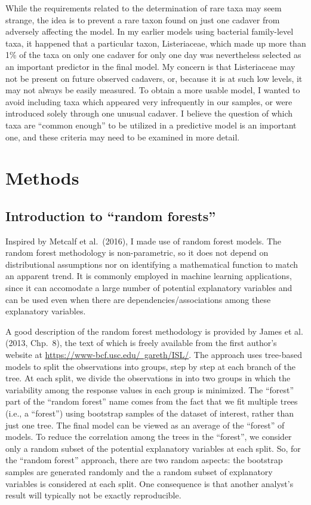 \documentclass{article}
\begin{document}
While the requirements related to the determination of rare taxa may
seem strange, the idea is to prevent a rare taxon found on just one
cadaver from adversely affecting the model.  In my earlier models
using bacterial family-level taxa, it happened that a particular
taxon, Listeriaceae, which made up more than 1\% of the taxa on only
one cadaver for only one day was nevertheless selected as an important
predictor in the final model.  My concern is that Listeriaceae may not
be present on future observed cadavers, or, because it is at such low
levels, it may not always be easily measured.  To obtain a more usable
model, I wanted to avoid including taxa which appeared very
infrequently in our samples, or were introduced solely through one
unusual cadaver.  I believe the question of which taxa are ``common
enough'' to be utilized in a predictive model is an important one, and
these criteria may need to be examined in more detail.


\section{Methods}

\subsection{Introduction to ``random forests''}

Inspired by Metcalf et al.~(2016), I made use of random forest models.
The random forest methodology is non-parametric, so it does not depend
on distributional assumptions nor on identifying a mathematical
function to match an apparent trend.  It is commonly employed in
machine learning applications, since it can accomodate a large number
of potential explanatory variables and can be used even when there are
dependencies/associations among these explanatory variables.

A good description of the random forest methodology is provided by
James et al. (2013, Chp.~8), the text of which is freely available
from the first author's website at 
\href{https://www-bcf.usc.edu/~gareth/ISL/}{https://www-bcf.usc.edu/~gareth/ISL/}.  The
approach uses tree-based models to split the observations into groups,
step by step at each branch of the tree.  At each split, we divide the
observations in into two groups in which the variability among the
response values in each group is minimized.  The ``forest'' part of
the ``random forest'' name comes from the fact that we fit multiple
trees (i.e., a ``forest'') using bootstrap samples of the dataset of
interest, rather than just one tree.  The final model can be viewed as
an average of the ``forest'' of models.  To reduce the correlation
among the trees in the ``forest'', we consider only a random subset of
the potential explanatory variables at each split.  So, for the
``random forest'' approach, there are two random aspects: the
bootstrap samples are generated randomly and the a random subset of
explanatory variables is considered at each split.  One consequence is
that another analyst's result will typically not be exactly
reproducible.
\end{document}

